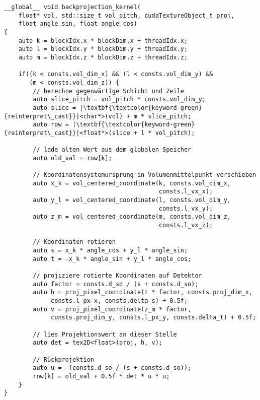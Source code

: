 \begin{code}
\begin{verbatim}
__global__ void backprojection_kernel(
    float* vol, std::size_t vol_pitch, cudaTextureObject_t proj,
    float angle_sin, float angle_cos)
{
    auto k = blockIdx.x * blockDim.x + threadIdx.x;
    auto l = blockIdx.y * blockDim.y + threadIdx.y;
    auto m = blockIdx.z * blockDim.z + threadIdx.z;

    if((k < consts.vol_dim_x) && (l < consts.vol_dim_y) &&
       (m < consts.vol_dim_z)) {
        // berechne gegenwärtige Schicht und Zeile
        auto slice_pitch = vol_pitch * consts.vol_dim_y;
        auto slice = |\textbf{\textcolor{keyword-green}{reinterpret\_cast}}|<char*>(vol) + m * slice_pitch;
        auto row = |\textbf{\textcolor{keyword-green}{reinterpret\_cast}}|<float*>(slice + l * vol_pitch);

        // lade alten Wert aus dem globalen Speicher
        auto old_val = row[k];

        // Koordinatensystemursprung in Volumenmittelpunkt verschieben
        auto x_k = vol_centered_coordinate(k, consts.vol_dim_x,
                                           consts.l_vx_x);
        auto y_l = vol_centered_coordinate(l, consts.vol_dim_y,
                                           consts.l_vx_y);
        auto z_m = vol_centered_coordinate(m, consts.vol_dim_z,
                                           consts.l_vx_z);

        // Koordinaten rotieren
        auto s = x_k * angle_cos + y_l * angle_sin;
        auto t = -x_k * angle_sin + y_l * angle_cos;

        // projiziere rotierte Koordinaten auf Detektor
        auto factor = consts.d_sd / (s + consts.d_so);
        auto h = proj_pixel_coordinate(t * factor, consts.proj_dim_x,
             consts.l_px_x, consts.delta_s) + 0.5f;
        auto v = proj_pixel_coordinate(z_m * factor,
             consts.proj_dim_y, consts.l_px_y, consts.delta_t) + 0.5f;

        // lies Projektionswert an dieser Stelle
        auto det = tex2D<float>(proj, h, v);

        // Rückprojektion
        auto u = -(consts.d_so / (s + consts.d_so));
        row[k] = old_val + 0.5f * det * u * u;
    }
}
\end{verbatim}
\label{app:impl_bp}
\end{code}

